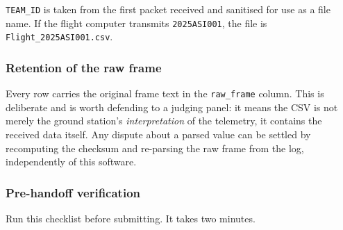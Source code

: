 \documentclass[11pt,a4paper]{article}
\newcommand{\file}[1]{\texttt{#1}}
\newcommand{\code}[1]{\texttt{#1}}
\begin{document}
\code{TEAM\_ID} is taken from the first packet received and sanitised for use
as a file name. If the flight computer transmits \code{2025ASI001}, the file
is \file{Flight\_2025ASI001.csv}.

\subsubsection{Retention of the raw frame}

Every row carries the original frame text in the \code{raw\_frame} column.
This is deliberate and is worth defending to a judging panel: it means the
CSV is not merely the ground station's \emph{interpretation} of the
telemetry, it contains the received data itself. Any dispute about a parsed
value can be settled by recomputing the checksum and re-parsing the raw frame
from the log, independently of this software.

\subsubsection{Pre-handoff verification}

Run this checklist before submitting. It takes two minutes.
\end{document}
